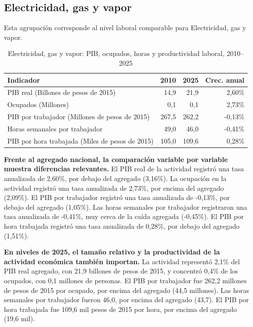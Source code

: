 \subsection{Electricidad, gas y vapor}

Esta agrupación corresponde al nivel laboral comparable para Electricidad, gas y vapor.

\begin{table}[H]
\centering
\caption{Electricidad, gas y vapor: PIB, ocupados, horas y productividad laboral, 2010--2025}
\label{tab:agg25_d_productividad}
\small
\begin{tabular}{lrrr}
\toprule
Indicador & 2010 & 2025 & Crec. anual \\
\midrule
PIB real  (Billones de pesos de 2015) & 14,9 & 21,9 & 2,60\% \\
Ocupados (Millones) & 0,1 & 0,1 & 2,73\% \\
PIB por trabajador (Millones de pesos de 2015) & 267,5 & 262,2 & -0,13\% \\
Horas semanales por trabajador & 49,0 & 46,0 & -0,41\% \\
PIB por hora trabajada (Miles de pesos de 2015) & 105,0 & 109,6 & 0,28\% \\
\bottomrule
\end{tabular}
\end{table}

\textbf{Frente al agregado nacional, la comparación variable por variable muestra diferencias relevantes.} El PIB real de la actividad registró una tasa anualizada de 2,60\%, por debajo del agregado (3,16\%). La ocupación en la actividad registró una tasa anualizada de 2,73\%, por encima del agregado (2,09\%). El PIB por trabajador registró una tasa anualizada de -0,13\%, por debajo del agregado (1,05\%). Las horas semanales por trabajador registraron una tasa anualizada de -0,41\%, muy cerca de la caída agregada (-0,45\%). El PIB por hora trabajada registró una tasa anualizada de 0,28\%, por debajo del agregado (1,51\%).

\textbf{En niveles de 2025, el tamaño relativo y la productividad de la actividad económica también importan.} La actividad representó 2,1\% del PIB real agregado, con 21,9 billones de pesos de 2015, y concentró 0,4\% de los ocupados, con 0,1 millones de personas. El PIB por trabajador fue 262,2 millones de pesos de 2015 por ocupado, por encima del agregado (44,5 millones). Las horas semanales por trabajador fueron 46,0, por encima del agregado (43,7). El PIB por hora trabajada fue 109,6 mil pesos de 2015 por hora, por encima del agregado (19,6 mil).


